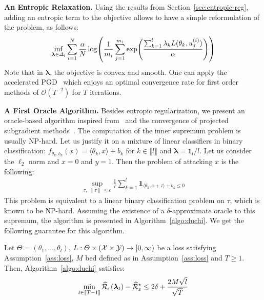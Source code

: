 \textbf{An Entropic Relaxation.} Using the results from Section~\ref{sec:entropic-reg}, adding an entropic term to the objective allows to have a simple reformulation of the problem, as follows:
\begin{align*}
  \inf_{\bm{\lambda}\in \Delta_l}\sum_{i=1}^\numsamples  \frac{\alpha}{\numsamples}\log\left( \frac{1}{m_i}\sum_{j=1}^{m_i}\exp\left(\frac{\sum_{k=1}^l \lambda_k\loss(\theta_k,u_j^{(i)})}{\alpha}\right)\right)
\end{align*}
Note that in $\bm{\lambda}$, the objective is convex and smooth. One can  apply the accelerated PGD~\citep{beck2009fast,tseng2008accelerated} which enjoys an optimal convergence rate for first order methods of $\mathcal{O}(T^{-2})$ for $T$ iterations.

\textbf{A First Oracle Algorithm.} Besides entropic regularization, we present an oracle-based algorithm inspired from~\citep{sinha2017certifying} and the convergence of projected subgradient methods~\citep{boyd2003subgradient}. The computation of the inner supremum problem is usually NP-hard. Let us justify it on a mixture of linear classifiers in binary classification: $f_{\theta_k,b_k}(x) = \langle \theta_k,x\rangle+b_k$ for $k\in \llbracket l\rrbracket$ and $\bm{\lambda}=\mathbf{1}_l/l$. Let us consider the $\ell_2$ norm and $x=0$ and $y=1$. Then the problem of attacking $x$ is the following:
\begin{align*}
    \sup_{\tau,~\lVert \tau\rVert\leq\varepsilon} \frac{1}{l}\sum_{k=1}^l\mathbf{1}_{\langle \theta_k,x+\tau\rangle+b_k\leq0}
\end{align*}
This problem is equivalent to a linear binary classification problem on $\tau$, which is known to be NP-hard. Assuming the existence of a $\delta$-approximate oracle to this supremum, the algorithm is presented in Algorithm~\ref{algo:duchi}. We get the following guarantee for this algorithm. %
\begin{prop}
\label{prop:algo-oracle}
Let $\Theta = (\theta_1,\dots,\theta_l)$, $L:\Theta\times(\mathcal{X}\times\mathcal{Y})\to [0,\infty)$ be a loss satisfying Assumption~\ref{ass:loss}, $M$ bed defined as in Assumption~\ref{ass:loss} and $T\geq 1$. Then, Algorithm~\ref{algo:duchi} satisfies:  
\begin{align*}
    \min_{t\in\llbracket T-1\rrbracket} \widehat{\mathcal{R}}_{\varepsilon}(\bm{\lambda}_t)-\widehat{\mathcal{R}}_{\varepsilon}^{\star}\leq2\delta+\textcolor{black}{ \frac{2M\sqrt{l}}{\sqrt{T}}}
\end{align*}
\end{prop}

